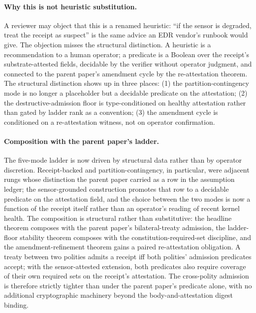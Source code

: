 \paragraph{Why this is not heuristic substitution.}
A reviewer may object that this is a renamed heuristic: ``if the sensor is degraded, treat the receipt as suspect'' is the same advice an EDR vendor's runbook would give. The objection misses the structural distinction. A heuristic is a recommendation to a human operator; a predicate is a Boolean over the receipt's substrate-attested fields, decidable by the verifier without operator judgment, and connected to the parent paper's amendment cycle by the re-attestation theorem. The structural distinction shows up in three places: (1) the partition-contingency mode is no longer a placeholder but a decidable predicate on the attestation; (2) the destructive-admission floor is type-conditioned on healthy attestation rather than gated by ladder rank as a convention; (3) the amendment cycle is conditioned on a re-attestation witness, not on operator confirmation.

\paragraph{Composition with the parent paper's ladder.}
The five-mode ladder is now driven by structural data rather than by operator discretion. Receipt-backed and partition-contingency, in particular, were adjacent rungs whose distinction the parent paper carried as a row in the assumption ledger; the sensor-grounded construction promotes that row to a decidable predicate on the attestation field, and the choice between the two modes is now a function of the receipt itself rather than an operator's reading of recent kernel health. The composition is structural rather than substitutive: the headline theorem composes with the parent paper's bilateral-treaty admission, the ladder-floor stability theorem composes with the constitution-required-set discipline, and the amendment-refinement theorem gains a paired re-attestation obligation. A treaty between two polities admits a receipt iff both polities' admission predicates accept; with the sensor-attested extension, both predicates also require coverage of their own required sets on the receipt's attestation. The cross-polity admission is therefore strictly tighter than under the parent paper's predicate alone, with no additional cryptographic machinery beyond the body-and-attestation digest binding.

